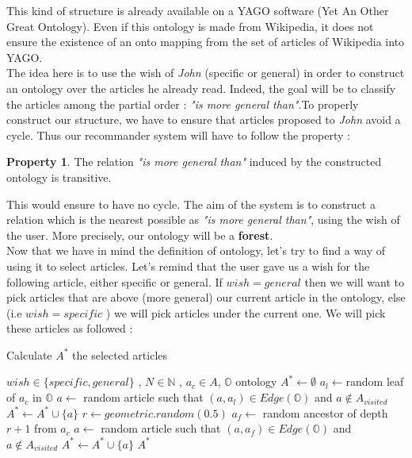 \documentclass[11pt]{article}
\theoremstyle{plain}
\theoremstyle{definition}
\newtheorem{pro}{Property}
\theoremstyle{remark}
\begin{document}
This kind of structure is already available on a YAGO software (Yet An Other Great Ontology). Even if this ontology is made from Wikipedia, it does not ensure the existence of an onto mapping from the set of articles of Wikipedia into YAGO.\\
The idea here is to use the wish of \textit{John} (specific or general) in order to construct an ontology over the articles he already read. Indeed, the goal will be to classify the articles among the partial order : \textit{"is more general than"}.To properly construct our structure, we have to ensure that articles proposed to \textit{John} avoid a cycle. Thus our recommander system will have to follow the property : 

\begin{pro}
The relation \textit{"is more general than"} induced by the constructed ontology is transitive. 
\end{pro}

This would ensure to have no cycle. The aim of the system is to construct a relation which is the nearest possible as \textit{"is more general than"}, using the wish of the user. More precisely, our ontology will be a \textbf{forest}.\\

Now that we have in mind the definition of ontology, let's try to find a way of using it to select articles. Let's remind that the user gave us a wish for the following article, either specific or general. If $wish = general$ then we will want to pick articles that are above (more general) our current article in the ontology, else (i.e $wish=specific$ ) we will pick articles under the current one. We will pick these articles as followed :

\begin{algorithm}
  \caption{Calculate $A^*$ the selected articles}
  \begin{algorithmic}
    \REQUIRE $wish \in \{specific , general\}$ , $N \in \mathbb{N}$ , $a_c \in A$, $\mathbb{O}$ ontology
    \STATE $A^* \leftarrow \emptyset$
    \STATE $a_l \leftarrow $random leaf of $a_c$ in $\mathbb{O}$
    \STATE $a \leftarrow$ random article such that $(a,a_l) \in Edge(\mathbb{O})$ and $a \notin A_{visited}$
    \STATE $ A^*  \leftarrow A^* \cup \{a\}$
    \ELSE 
    \STATE $ r \leftarrow geometric.random(0.5)$
    \STATE $a_f \leftarrow $ random ancestor of depth $r+1$ from $a_c$
    \STATE $a \leftarrow $ random article such that $(a,a_f) \in Edge(\mathbb{O})$ and $a \notin A_{visited}$
    \STATE $ A^*  \leftarrow A^* \cup \{a\}$ 
    \ENDIF
    \ENDWHILE
    \RETURN $A^*$
  \end{algorithmic}
\end{algorithm}
\end{document}

